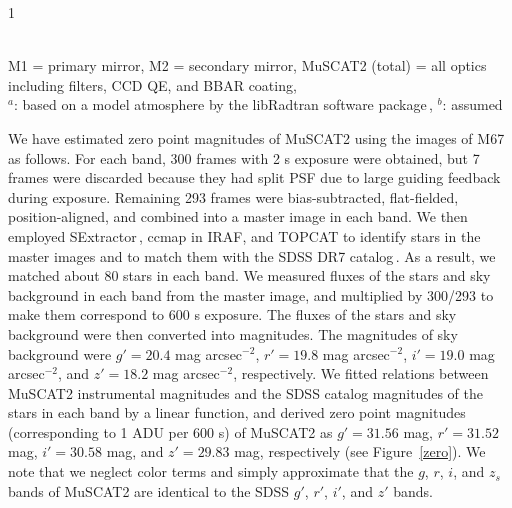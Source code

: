 \documentclass[a4paper,12pt]{spieman}  %
\begin{document}
\begin{spacing}{1}
\begin{table}
\begin{center}
{\footnotesize
\caption{Summary of throughput (TP) of MuSCAT2 on the TCS 1.52m telescope.}
\label{throughput}
}
{\scriptsize \\ M1 = primary mirror, M2 = secondary mirror, MuSCAT2 (total) = all optics including filters, CCD QE, and BBAR coating,\\
$^a$: based on a model atmosphere by the libRadtran software package\cite{2005ACP.....5.1855M}\,\!, $^b$: assumed}
\end{center}
\end{table}

We have estimated zero point magnitudes of MuSCAT2 using the images of M67 as follows.
For each band, 300 frames with 2 s exposure were obtained,
but 7 frames were discarded because they had split PSF due to
large guiding feedback during exposure.
Remaining 293 frames were bias-subtracted, flat-fielded, position-aligned,
and combined into a master image in each band.
We then employed SExtractor\cite{1996A&AS..117..393B}\,\!, ccmap in IRAF,
and TOPCAT\cite{2005ASPC..347...29T}
to identify stars in the master images and to match them with
the SDSS DR7 catalog\cite{2009ApJS..182..543A}\,\!.
As a result, we matched about 80 stars in each band.
We measured fluxes of the stars and sky background in each band from the master image,
and multiplied by 300/293 to make them correspond to 600 s exposure.
The fluxes of the stars and sky background were then converted into magnitudes.
The magnitudes of sky background were
$g' = 20.4$ mag arcsec$^{-2}$, $r' = 19.8$ mag arcsec$^{-2}$,
$i' = 19.0$ mag arcsec$^{-2}$, and $z' = 18.2$ mag arcsec$^{-2}$, respectively.
We fitted relations between MuSCAT2 instrumental magnitudes and the SDSS catalog magnitudes
of the stars in each band by a linear function, and derived zero point magnitudes
(corresponding to 1 ADU per 600 s)
of MuSCAT2 as $g' = 31.56$ mag, $r' = 31.52$ mag, $i' = 30.58$ mag, and $z' = 29.83$ mag, respectively
(see Figure~\ref{zero}).
We note that we neglect color terms and simply approximate that
the $g$, $r$, $i$, and $z_{s}$ bands of MuSCAT2 are identical to
the SDSS $g'$, $r'$, $i'$, and $z'$ bands.


\end{spacing}
\end{document}

